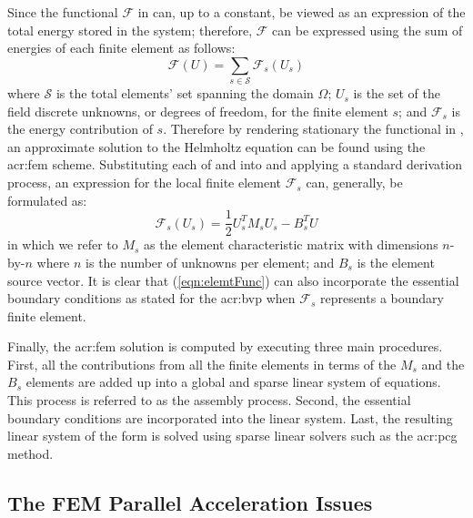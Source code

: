 Since the functional $\mathcal{F}$ in  can, up to a constant, be viewed as an expression of the total energy stored in the system; therefore, $\mathcal{F}$ can be expressed using the sum of energies of each finite element as follows:
\begin{equation}
	\mathcal{F}(U)=\sum_{s\in\mathcal{S}}\mathcal{F}_{s}(U_{s})
	\label{eqn:discFunc}
\end{equation}
where $\mathcal{S}$ is the total elements' set spanning the domain $\Omega$; $U_s$ is the set of the field discrete unknowns, or degrees of freedom, for the finite element $s$; and $\mathcal{F}_s$ is the energy contribution of $s$.
Therefore by rendering stationary the functional in , an approximate solution to the Helmholtz equation can be found using the \gls{acr:fem} scheme.
Substituting each of  and  into  and applying a standard derivation process, an expression for the local finite element $\mathcal{F}_s$ can, generally, be formulated as:
\begin{equation}
	\mathcal{F}_s(U_s)=\frac{1}{2} U^T_s M_s U_s -B_s^T U
	\label{eqn:elemtFunc}
\end{equation}
in which we refer to $M_s$ as the element characteristic matrix with dimensions $n$-by-$n$ where $n$ is the number of unknowns per element; and $B_s$ is the element source vector.
It is clear that (\ref{eqn:elemtFunc}) can also incorporate the essential boundary conditions as stated for the \gls{acr:bvp}
when $\mathcal{F}_s$ represents a boundary finite element.


Finally, the \gls{acr:fem} solution is computed by executing three main procedures.
First, all the contributions from all the finite elements in terms of the $M_s$ and the $B_s$ elements are added up into a global and sparse linear system of equations. This process is referred to as the assembly process.
Second, the essential boundary conditions are incorporated into the linear system.
Last, the resulting linear system of the form  is solved using sparse linear solvers such as the \gls{acr:pcg} method.


\subsection{The FEM Parallel Acceleration Issues}


